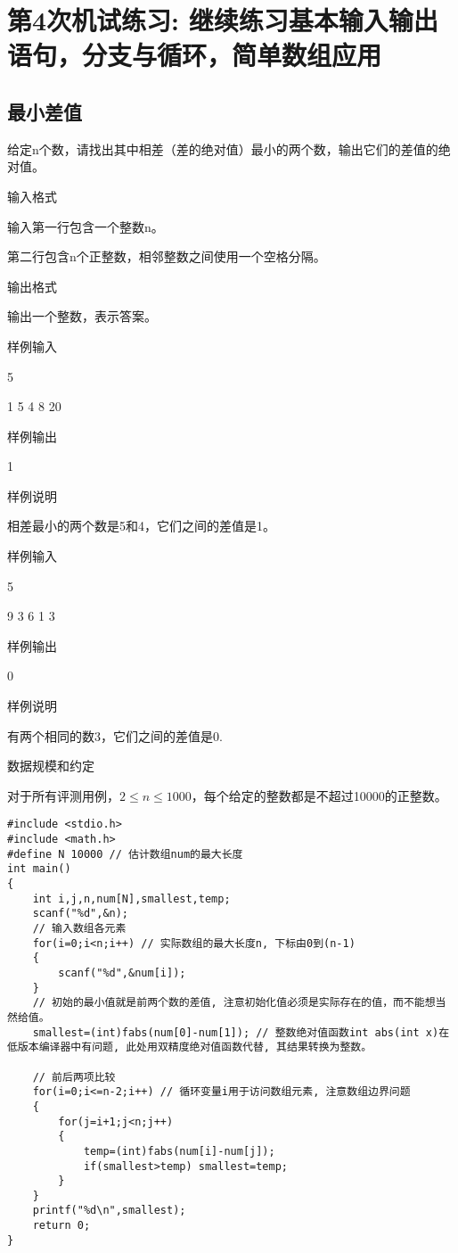 %
%
%
\chapter{第4次机试练习: 继续练习基本输入输出语句，分支与循环，简单数组应用}

\section{最小差值}
给定n个数，请找出其中相差（差的绝对值）最小的两个数，输出它们的差值的绝对值。

输入格式

输入第一行包含一个整数n。

第二行包含n个正整数，相邻整数之间使用一个空格分隔。

输出格式

输出一个整数，表示答案。

样例输入

5

1 5 4 8 20

样例输出

1

样例说明

相差最小的两个数是5和4，它们之间的差值是1。

样例输入

5

9 3 6 1 3

样例输出

0

样例说明

有两个相同的数3，它们之间的差值是0.

数据规模和约定

对于所有评测用例，$2\le n\le1000$，每个给定的整数都是不超过10000的正整数。

\begin{lstlisting}
#include <stdio.h>
#include <math.h>
#define N 10000 // 估计数组num的最大长度 
int main()
{
	int i,j,n,num[N],smallest,temp; 
	scanf("%d",&n);
	// 输入数组各元素
	for(i=0;i<n;i++) // 实际数组的最大长度n, 下标由0到(n-1)
	{
		scanf("%d",&num[i]);
	}
	// 初始的最小值就是前两个数的差值, 注意初始化值必须是实际存在的值，而不能想当然给值。
	smallest=(int)fabs(num[0]-num[1]); // 整数绝对值函数int abs(int x)在低版本编译器中有问题, 此处用双精度绝对值函数代替, 其结果转换为整数。  
	
	// 前后两项比较
	for(i=0;i<=n-2;i++) // 循环变量i用于访问数组元素, 注意数组边界问题
	{
		for(j=i+1;j<n;j++)
		{
			temp=(int)fabs(num[i]-num[j]);
			if(smallest>temp) smallest=temp;
		}
	}
	printf("%d\n",smallest);
	return 0;
} 
\end{lstlisting}

